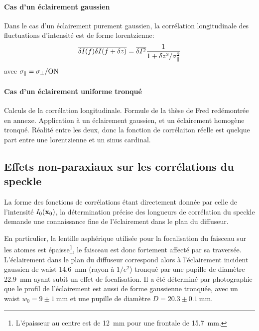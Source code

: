 \paragraph*{Cas d'un éclairement gaussien}
Dans le cas d'un éclairement purement gaussien, la corrélation longitudinale des fluctuations d'intensité est de forme lorentzienne:
\begin{equation}
\overline{\delta I(f) \delta I(f+\delta z)} = \overline{\delta I^2} \frac{1}{1+\delta z^2 / \sigma_{\parallel}^2}
\end{equation}
avec $\sigma_{\parallel}=\sigma_{\perp}/\mathrm{ON}$

\paragraph*{Cas d'un éclairement uniforme tronqué}

Calculs de la corrélation longitudinale. Formule de la thèse de Fred redémontrée en annexe. Application à un éclairement gaussien, et un éclairement homogène tronqué. Réalité entre les deux, donc la fonction de corrélaiton réelle est quelque part entre une lorentzienne et un sinus cardinal. 





\subsection{Effets non-paraxiaux sur les corrélations du speckle}
\label{sc:speckle_non_paraxial}

La forme des fonctions de corrélations étant directement donnée par celle de l'intensité $I_0(\mathbf{x}_0)$, la détermination précise des longueurs de corrélation du speckle demande une connaissance fine de l'éclairement dans le plan du diffuseur. 

En particulier, la lentille asphérique utilisée pour la focalisation du faisceau sur les atomes est épaisse\footnote{L'épaisseur au centre est de \SI{12}{\milli\metre} pour une frontale de \SI{15.7}{\milli\metre}.}, le faisceau est donc fortement affecté par sa traversée. L'éclairement dans le plan du diffuseur  correspond alors à l'éclairement incident gaussien de waist \SI{14.6}{\milli\metre} (rayon à $1/e^2$) tronqué par une pupille de diamètre \SI{22.9}{\milli\metre} ayant subit un effet de focalisation. Il a été déterminé par photographie que le profil de l'éclairement est aussi de forme gaussienne tronquée, avec un waist $w_0=9\pm\SI{1}{\milli\metre}$ et une pupille de diamètre $D=20.3\pm\SI{0.1}{\milli\metre}$.

